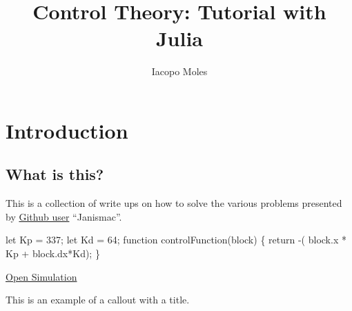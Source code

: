 \documentclass[
  8pt,
  a4paper,
]{book}
\title{Control Theory: Tutorial with Julia}
\author{Iacopo Moles}
\date{}
\newenvironment{Shaded}{\begin{snugshade}}{\end{snugshade}}
\newcommand{\NormalTok}[1]{\textcolor[rgb]{0.00,0.23,0.31}{#1}}
\renewcommand*\contentsname{Table of contents}
\newcommand\contentsname{Table of contents}
\begin{document}
\frontmatter
\maketitle


\renewcommand*\contentsname{Table of contents}
{
\setcounter{tocdepth}{2}
\tableofcontents
}

\mainmatter
{}

\chapter{Introduction}\label{introduction}

\section{What is this?}\label{what-is-this}

This is a collection of write ups on how to solve the various problems
presented by \href{https://janismac.github.io/ControlChallenges/}{Github
user} ``Janismac''.

\begin{Shaded}
\begin{Highlighting}[]
\NormalTok{let Kp = 337;}
\NormalTok{let Kd = 64;}
\NormalTok{function controlFunction(block)}
\NormalTok{\{}
\NormalTok{  return {-}( block.x * Kp + block.dx*Kd);}
\NormalTok{\}}
\end{Highlighting}
\end{Shaded}

\href{https://pages.icpmol.es/ControlChallenges/index.html?target=TutorialBlockWithFriction&code=bGV0IEtwID0gMzM3OwpsZXQgS2QgPSA2NDsKZnVuY3Rpb24gY29udHJvbEZ1bmN0aW9uKGJsb2NrKQp7CiAgcmV0dXJuIC0oIGJsb2NrLnggKiBLcCArIGJsb2NrLmR4KktkKTsKfQ==}{Open
Simulation}

\begin{tcolorbox}[enhanced jigsaw, colback=white, colframe=quarto-callout-tip-color-frame, toprule=.15mm, leftrule=.75mm, colbacktitle=quarto-callout-tip-color!10!white, rightrule=.15mm, arc=.35mm, toptitle=1mm, opacitybacktitle=0.6, bottomtitle=1mm, breakable, title=\textcolor{quarto-callout-tip-color}{\faLightbulb}\hspace{0.5em}{Tip with Title}, titlerule=0mm, bottomrule=.15mm, left=2mm, opacityback=0, coltitle=black]

This is an example of a callout with a title.

\end{tcolorbox}
\end{document}
